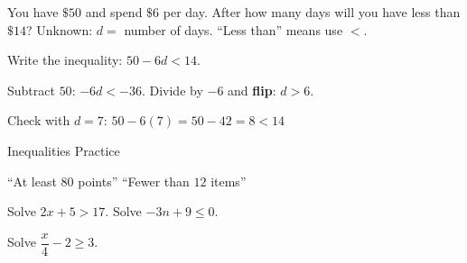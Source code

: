 \begin{stepExample}{You have $\$50$ and spend $\$6$ per day. After how many days will you have less than $\$14$?}
     Unknown: $d =$ number of days. ``Less than'' means use $<$.

     Write the inequality: $50 - 6d < 14$.

     Subtract $50$: $-6d < -36$. Divide by $-6$ and \textbf{flip}: $d > 6$.

     Check with $d = 7$: $50 - 6(7) = 50 - 42 = 8 < 14$ \checkmark
\end{stepExample}


\newpage
\begin{stepPractice}{Inequalities Practice}
    \resetProblems

    \begin{multicols}{2}
    \prob ``At least $80$ points'' \answerBlank[1.5cm]
    \prob ``Fewer than $12$ items'' \answerBlank[1.5cm]
    \end{multicols}

    \begin{multicols}{2}
    \prob Solve $2x + 5 > 17$. \answerBlank[2cm]
    \prob Solve $-3n + 9 \leq 0$. \answerBlank[2cm]
    \end{multicols}

    \prob Solve $\dfrac{x}{4} - 2 \geq 3$. \answerBlank[2cm]

\end{stepPractice}
